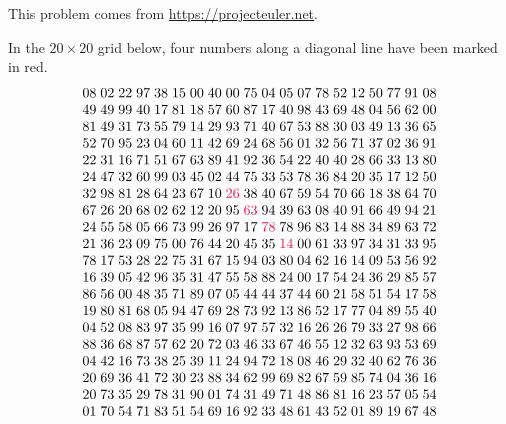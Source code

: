 \begin{problem} %
This problem comes from \url{https://projecteuler.net}.

In the $20 \times 20$ grid below, four numbers along a diagonal line have been marked in red.
%
\begin{align*}
\centering
\arraycolsep=1.4pt\begin{array}{cccccccccccccccccccc}
08&02&22&97&38&15&00&40&00&75&04&05&07&78&52&12&50&77&91&08\\
49&49&99&40&17&81&18&57&60&87&17&40&98&43&69&48&04&56&62&00\\
81&49&31&73&55&79&14&29&93&71&40&67&53&88&30&03&49&13&36&65\\
52&70&95&23&04&60&11&42&69&24&68&56&01&32&56&71&37&02&36&91\\
22&31&16&71&51&67&63&89&41&92&36&54&22&40&40&28&66&33&13&80\\
24&47&32&60&99&03&45&02&44&75&33&53&78&36&84&20&35&17&12&50\\
32&98&81&28&64&23&67&10&\textcolor{red}{26}&38&40&67&59&54&70&66&18&38&64&70\\
67&26&20&68&02&62&12&20&95&\textcolor{red}{63}&94&39&63&08&40&91&66&49&94&21\\
24&55&58&05&66&73&99&26&97&17&\textcolor{red}{78}&78&96&83&14&88&34&89&63&72\\
21&36&23&09&75&00&76&44&20&45&35&\textcolor{red}{14}&00&61&33&97&34&31&33&95\\
78&17&53&28&22&75&31&67&15&94&03&80&04&62&16&14&09&53&56&92\\
16&39&05&42&96&35&31&47&55&58&88&24&00&17&54&24&36&29&85&57\\
86&56&00&48&35&71&89&07&05&44&44&37&44&60&21&58&51&54&17&58\\
19&80&81&68&05&94&47&69&28&73&92&13&86&52&17&77&04&89&55&40\\
04&52&08&83&97&35&99&16&07&97&57&32&16&26&26&79&33&27&98&66\\
88&36&68&87&57&62&20&72&03&46&33&67&46&55&12&32&63&93&53&69\\
04&42&16&73&38&25&39&11&24&94&72&18&08&46&29&32&40&62&76&36\\
20&69&36&41&72&30&23&88&34&62&99&69&82&67&59&85&74&04&36&16\\
20&73&35&29&78&31&90&01&74&31&49&71&48&86&81&16&23&57&05&54\\
01&70&54&71&83&51&54&69&16&92&33&48&61&43&52&01&89&19&67&48
\end{array}
\end{align*}


\end{problem}
